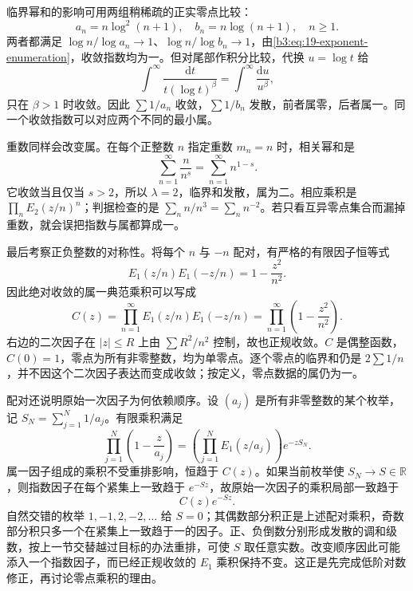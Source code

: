 \ProseParagraphBreak

临界幂和的影响可用两组稍稀疏的正实零点比较：
\[
 a_n=n\log^2(n+1),\quad b_n=n\log(n+1),\quad n\ge1.
\]
两者都满足 \(\log n/\log a_n\to1\)、\(\log n/\log b_n\to1\)，由\eqref{b3:eq:19-exponent-enumeration}，收敛指数均为一。但对尾部作积分比较，代换 \(u=\log t\) 给
\[
 \int^{\infty}\frac{\mathrm{d}t}{t(\log t)^\beta}
 =\int^{\infty}\frac{\mathrm{d}u}{u^\beta},
\]
只在 \(\beta>1\) 时收敛。因此 \(\sum1/a_n\) 收敛，\(\sum1/b_n\) 发散，前者属零，后者属一。同一个收敛指数可以对应两个不同的最小属。

\ProseParagraphBreak

重数同样会改变属。在每个正整数 \(n\) 指定重数 \(m_n=n\) 时，相关幂和是
\[
 \sum_{n=1}^{\infty}\frac{n}{n^s}
 =\sum_{n=1}^{\infty}n^{1-s}.
\]
它收敛当且仅当 \(s>2\)，所以 \(\lambda=2\)，临界和发散，属为二。相应乘积是 \(\prod_n E_2(z/n)^n\)；判据检查的是 \(\sum_n n/n^3=\sum_n n^{-2}\)。若只看互异零点集合而漏掉重数，就会误把指数与属都算成一。

\ProseParagraphBreak

最后考察正负整数的对称性。将每个 \(n\) 与 \(-n\) 配对，有严格的有限因子恒等式
\[
 E_1(z/n)E_1(-z/n)=1-\frac{z^2}{n^2}.
\]
因此绝对收敛的属一典范乘积可以写成
\[
 C(z)=\prod_{n=1}^{\infty}E_1(z/n)E_1(-z/n)
     =\prod_{n=1}^{\infty}\left(1-\frac{z^2}{n^2}\right).
\]
右边的二次因子在 \(|z|\le R\) 上由 \(\sum R^2/n^2\) 控制，故也正规收敛。\(C\) 是偶整函数，\(C(0)=1\)，零点为所有非零整数，均为单零点。逐个零点的临界和仍是 \(2\sum1/n\)，并不因这个二次因子表达而变成收敛；按定义，零点数据的属仍为一。

\ProseParagraphBreak

配对还说明原始一次因子为何依赖顺序。设 \((a_j)\) 是所有非零整数的某个枚举，记 \(S_N=\sum_{j=1}^N1/a_j\)。有限乘积满足
\[
 \prod_{j=1}^N\left(1-\frac z{a_j}\right)
 =\left(\prod_{j=1}^NE_1(z/a_j)\right)e^{-zS_N}.
\]
属一因子组成的乘积不受重排影响，恒趋于 \(C(z)\)。如果当前枚举使 \(S_N\to S\in\mathbb R\)，则指数因子在每个紧集上一致趋于 \(e^{-Sz}\)，故原始一次因子的乘积局部一致趋于
\[
 C(z)e^{-Sz}.
\]
自然交错的枚举 \(1,-1,2,-2,\ldots\) 给 \(S=0\)；其偶数部分积正是上述配对乘积，奇数部分积只多一个在紧集上一致趋于一的因子。正、负倒数分别形成发散的调和级数，按上一节交替越过目标的办法重排，可使 \(S\) 取任意实数。改变顺序因此可能添入一个指数因子，而已经正规收敛的 \(E_1\) 乘积保持不变。这正是先完成低阶对数修正，再讨论零点乘积的理由。
